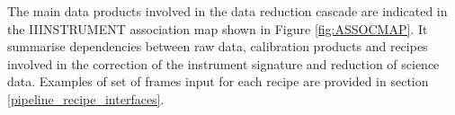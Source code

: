 


The main data products involved in the data reduction cascade are indicated 
in the IIINSTRUMENT association map shown in Figure \ref{fig:ASSOCMAP}. It summarise 
dependencies between raw data, calibration products and recipes involved in 
the correction of the instrument signature and reduction of science data. 
Examples of set of frames input for each recipe are provided in section 
\ref{pipeline_recipe_interfaces}.













    


